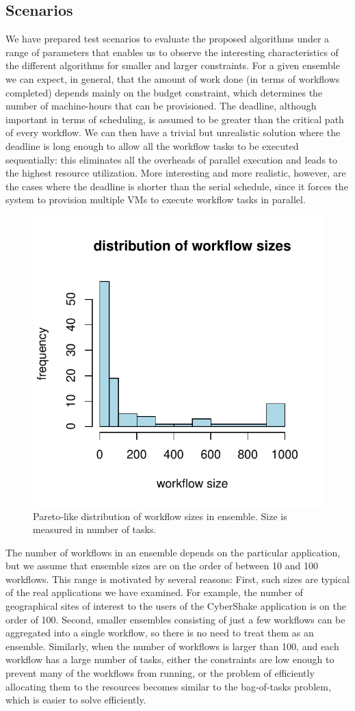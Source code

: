 \documentclass{sig-alternate}
\begin{document}
\subsection{Scenarios}
\label{sec:scenarios}

We have prepared test scenarios to evaluate the proposed algorithms under a
range of parameters that enables us to observe the interesting characteristics
of the different algorithms for smaller and larger constraints. For a given
ensemble we can expect, in general, that the amount of work done (in terms of
workflows completed) depends mainly on the budget constraint, which determines
the number of machine-hours that can be provisioned. The deadline, although
important in terms of scheduling, is assumed to be greater than the critical
path of every workflow. We can then have a trivial but unrealistic solution
where the deadline  is long enough to allow all the workflow tasks to be
executed sequentially: this eliminates all the overheads of parallel execution
and leads to the highest resource utilization. More interesting and more
realistic, however, are the cases where the deadline is shorter than the serial
schedule, since it forces the system to provision multiple VMs to execute
workflow tasks in parallel.


\begin{figure}[tb] 
\centering
\includegraphics[width=0.6\columnwidth]{figures/ensemble-pareto}
\caption{Pareto-like distribution of workflow sizes in ensemble. Size is
measured in number of tasks.}
\label{fig:ensemble-distribution}
\end{figure}

The number of workflows in an ensemble depends on the particular application, but
we assume that ensemble sizes are on the order of between 10 and 100 workflows.
This range is motivated by several reasons: First, such sizes are typical of the
real applications we have examined. For example, the number of geographical 
sites of interest to the users of the CyberShake application is on the order 
of 100. Second, smaller ensembles consisting of just a few workflows can be 
aggregated into a single workflow, so there is no need to treat them as an
ensemble. Similarly, when the number of workflows is larger than 100, and each 
workflow has a large number of tasks, either the constraints are low enough to
prevent many of the workflows from running, or the problem of efficiently 
allocating them to the resources becomes similar to the bag-of-tasks problem, 
which is easier to solve efficiently.
\end{document}
